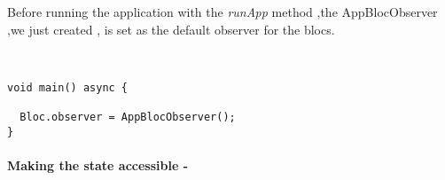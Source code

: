 Before running the application with the \textit{runApp} method ,the AppBlocObserver ,we just created , is set as the default observer for the blocs.
\begin{code}
\mbox{}\\
 \mbox{}
\label{code:2.14}
\begin{verbatim}
void main() async {

  Bloc.observer = AppBlocObserver();
}
\end{verbatim}
\mbox{}
\end{code}
\paragraph{Making the state accessible - }
\label{subpar:todo_app_bloc_core_state}

